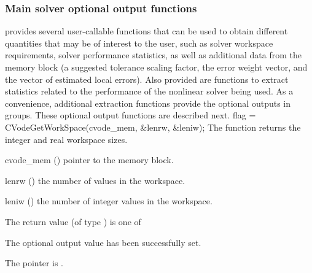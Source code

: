 \subsubsection{Main solver optional output functions}\label{sss:optout_main}
{\cvode} provides several user-callable functions that can be used to obtain
different quantities that may be of interest to the user, such as solver workspace
requirements, solver performance statistics, as well as additional data from
the {\cvode} memory block (a suggested tolerance scaling factor, the error weight
vector, and the vector of estimated local errors). Also provided are functions to
extract statistics related to the performance of the {\cvode} nonlinear solver
being used. As a convenience, additional extraction functions provide the optional 
outputs in groups.
These optional output functions are described next.
{
  flag = CVodeGetWorkSpace(cvode\_mem, \&lenrw, \&leniw);
}
{
  The function  returns the
  {\cvode} integer and real workspace sizes.
}
{
  \begin{args}
  \item[cvode\_mem] ()
    pointer to the {\cvode} memory block.
  \item[lenrw] ()
    the number of  values in the {\cvode} workspace.
  \item[leniw] ()
    the number of integer values in the {\cvode} workspace.
  \end{args}
}
{
  The return value  (of type ) is one of
  \begin{args}
  \item[\Id{CV\_SUCCESS}] 
    The optional output value has been successfully set.
  \item[\Id{CV\_MEM\_NULL}]
    The  pointer is .
  \end{args}
}
